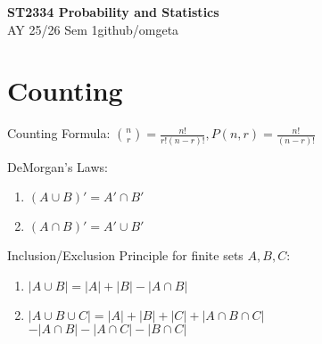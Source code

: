 \documentclass[12pt, a4paper]{article}
\newcommand{\mytitle}{ST2334 Probability and Statistics}
\newcommand{\myauthor}{github/omgeta}
\newcommand{\mydate}{AY 25/26 Sem 1}
\begin{document}
\raggedright
\footnotesize
\begin{multicols*}{3}
\setlength{\premulticols}{1pt}
\setlength{\postmulticols}{1pt}
\setlength{\multicolsep}{1pt}
\setlength{\columnsep}{2pt}

{\normalsize{\textbf{\mytitle}}} \\
{\footnotesize{\mydate\hspace{2pt}\textemdash\hspace{2pt}\myauthor}}
\section{Counting}
Counting Formula: $\displaystyle \binom nr = \frac{n!}{r!(n-r)!}, P(n, r) = \frac{n!}{(n-r)!}$

DeMorgan's Laws:
\begin{enumerate}[\roman*.]
  \item $(A\cup B)' = A' \cap B'$
  \item $(A\cap B)' = A' \cup B'$
\end{enumerate}

Inclusion/Exclusion Principle for finite sets $A,B,C$:
\begin{enumerate}[\roman*.]
  \item $|A \cup B|= |A| + |B| - |A\cap B|$
  \item $|A \cup B \cup C|= |A| + |B| + |C| + |A\cap B\cap C|$\\\hspace{6.7em}$- |A\cap B| - |A\cap C| - |B\cap C|$
\end{enumerate}


\end{multicols*}
\end{document}
